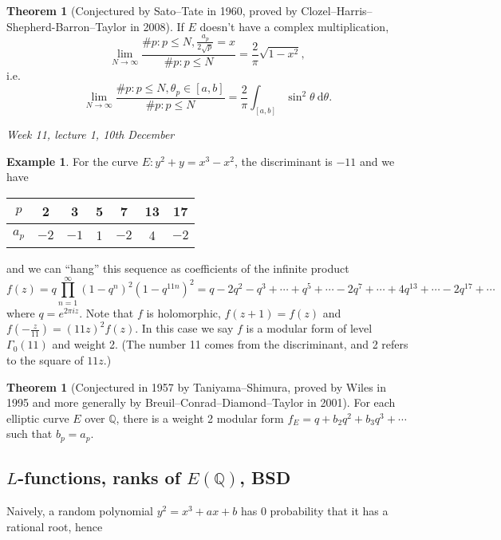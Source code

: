 \documentclass{article}
\newcommand{\Q}{\mathbb{Q}}
\theoremstyle{definition}
\newtheorem{thm}[defn]{Theorem}
\newtheorem{example}[defn]{Example}
\begin{document}
\begin{thm}[Conjectured by Sato--Tate in 1960, proved by Clozel--Harris--Shepherd-Barron--Taylor in 2008]
If $E$ doesn't have a complex multiplication,
\[
\lim_{N\rightarrow\infty}\frac{\# p:p\leq N,\frac{a_p}{2\sqrt p}=x}{\# p:p\leq N}=\frac{2}{\pi}\sqrt{1-x^2},
\]
i.e.
\[
\lim_{N\rightarrow\infty}\frac{\# p:p\leq N,\theta_p\in [a,b]}{\# p:p\leq N}=\frac{2}{\pi}\int_{[a,b]}\sin^2\theta \ \mathrm d\theta.
\]
\end{thm}

\begin{flushright}
\textit{Week 11, lecture 1, 10th December}
\end{flushright}

\begin{example}
For the curve $E:y^2+y=x^3-x^2$, the discriminant is $-11$ and we have

\begin{table}[h]
\centering
\begin{tabular}{c|cccccc}
$p$   & 2    & 3    & 5 & 7    & 13 & 17   \\ \hline
$a_p$ & $-2$ & $-1$ & 1 & $-2$ & 4  & $-2$
\end{tabular}
\end{table}

and we can ``hang'' this sequence as coefficients of the infinite product
\[
f(z)=q\prod_{n=1}^\infty (1-q^n)^2(1-q^{11n})^2=q-2q^2-q^3+\cdots+q^5+\cdots-2q^7+\cdots+4q^13+\cdots-2q^{17}+\cdots
\]
where $q=e^{2\pi iz}$. Note that $f$ is holomorphic, $f(z+1)=f(z)$ and $f\left(-\frac{z}{11}\right)=(11z)^2f(z)$. In this case we say $f$ is a modular form of level $\Gamma_0(11)$ and weight 2. (The number 11 comes from the discriminant, and 2 refers to the square of $11z$.)
\end{example}

\begin{thm}[Conjectured in 1957 by Taniyama--Shimura, proved by Wiles in 1995 and more generally by Breuil--Conrad--Diamond--Taylor in 2001]
\label{thm:taniyama-shimura}
For each elliptic curve $E$ over $\Q$, there is a weight 2 modular form $f_E=q+b_2q^2+b_3q^3+\cdots$ such that $b_p=a_p$.
\end{thm}

\subsection{$L$-functions, ranks of $E(\Q)$, BSD}
Naively, a random polynomial $y^2=x^3+ax+b$ has 0 probability that it has a rational root, hence
\end{document}
